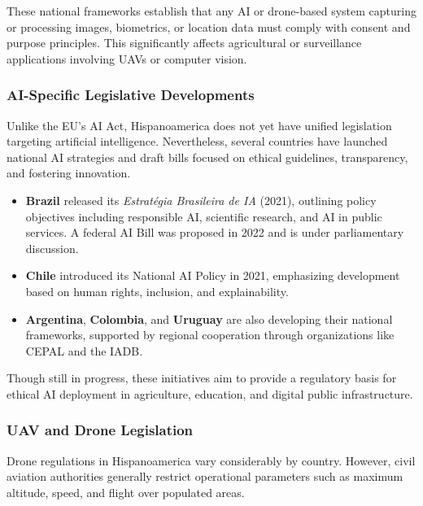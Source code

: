 \documentclass[12pt]{report} %
\begin{document}
These national frameworks establish that any AI or drone-based system capturing or processing images, biometrics, or location data must comply with consent and purpose principles. This significantly affects agricultural or surveillance applications involving UAVs or computer vision.

\subsubsection{AI-Specific Legislative Developments}

Unlike the EU’s AI Act, Hispanoamerica does not yet have unified legislation targeting artificial intelligence. Nevertheless, several countries have launched national AI strategies and draft bills focused on ethical guidelines, transparency, and fostering innovation.

\begin{itemize}
    \item \textbf{Brazil} released its \textit{Estratégia Brasileira de IA} (2021), outlining policy objectives including responsible AI, scientific research, and AI in public services. A federal AI Bill was proposed in 2022 and is under parliamentary discussion.
    
    \item \textbf{Chile} introduced its National AI Policy in 2021, emphasizing development based on human rights, inclusion, and explainability.
    
    \item \textbf{Argentina}, \textbf{Colombia}, and \textbf{Uruguay} are also developing their national frameworks, supported by regional cooperation through organizations like CEPAL and the IADB.
\end{itemize}

Though still in progress, these initiatives aim to provide a regulatory basis for ethical AI deployment in agriculture, education, and digital public infrastructure.

\subsubsection{UAV and Drone Legislation}

Drone regulations in Hispanoamerica vary considerably by country. However, civil aviation authorities generally restrict operational parameters such as maximum altitude, speed, and flight over populated areas.
\end{document}
